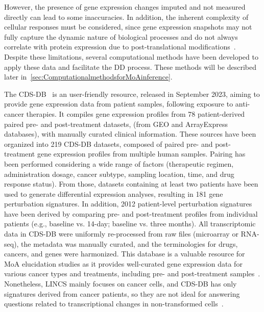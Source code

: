 However, the presence of gene expression changes imputed and not measured directly can lead to some inaccuracies. 
In addition, the inherent complexity of cellular responses must be considered, since gene expression snapshots may not fully capture the dynamic nature of biological processes and do not always correlate with protein expression due to post-translational modifications~\cite{RN38}. 
Despite these limitations, several computational methods have been developed to apply these data and facilitate the \gls{DD} process. 
These methods will be described later in~\ref{sec:ComputationalmethodsforMoAinference}. 

The \gls{CDS-DB}~\cite{RN84} is an user-friendly resource, released in September 2023, aiming to provide gene expression data from patient samples, following exposure to anti-cancer therapies. 
It compiles gene expression profiles from 78 patient-derived paired pre- and post-treatment datasets, (from \gls{GEO} and ArrayExpress databases), with manually curated clinical information. 
These sources have been organized into 219 \gls{CDS-DB} datasets, composed of paired pre- and post-treatment gene expression profiles from multiple human samples. 
Pairing has been performed considering a wide range of factors (therapeutic regimen, administration dosage, cancer subtype, sampling location, time, and drug response status). 
From those, datasets containing at least two patients have been used to generate differential expression analyses, resulting in 181 gene perturbation signatures. 
In addition, 2012 patient-level perturbation signatures have been derived by comparing pre- and post-treatment profiles from individual patients (e.g., baseline vs. 14-day; baseline vs. three months). 
All transcriptomic data in \gls{CDS-DB} were uniformly re-processed from raw files (microarray or \gls{RNA-seq}), the metadata was manually curated, and the terminologies for drugs, cancers, and genes were harmonized. 
This database is a valuable resource for \gls{MoA} elucidation studies as it provides well-curated gene expression data for various cancer types and treatments, including pre- and post-treatment samples~\cite{RN84}. 
Nonetheless, \gls{LINCS} mainly focuses on cancer cells, and \gls{CDS-DB} has only signatures derived from cancer patients, so they are not ideal for answering questions related to transcriptional changes in non-transformed cells~\cite{RN86}.

